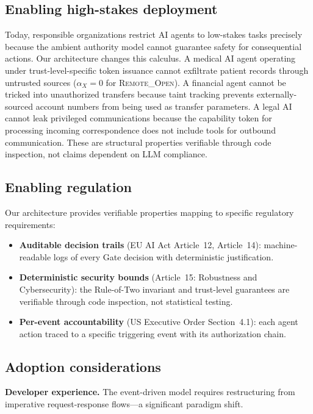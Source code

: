 \documentclass[pdflatex,sn-nature]{sn-jnl}%
\theoremstyle{thmstyleone}%
\theoremstyle{thmstyletwo}%
\theoremstyle{thmstylethree}%
\begin{document}
\subsection{Enabling high-stakes deployment}\label{subsec:highstakes}

Today, responsible organizations restrict AI agents to low-stakes tasks precisely because the ambient authority model cannot guarantee safety for consequential actions. Our architecture changes this calculus. A medical AI agent operating under trust-level-specific token issuance cannot exfiltrate patient records through untrusted sources ($\alpha_X = 0$ for \textsc{Remote\_Open}). A financial agent cannot be tricked into unauthorized transfers because taint tracking prevents externally-sourced account numbers from being used as transfer parameters. A legal AI cannot leak privileged communications because the capability token for processing incoming correspondence does not include tools for outbound communication. These are structural properties verifiable through code inspection, not claims dependent on LLM compliance.

\subsection{Enabling regulation}\label{subsec:regulation}

Our architecture provides verifiable properties mapping to specific regulatory requirements:
\begin{itemize}
  \item \textbf{Auditable decision trails} (EU AI Act Article~12, Article~14): machine-readable logs of every Gate decision with deterministic justification.
  \item \textbf{Deterministic security bounds} (Article~15: Robustness and Cybersecurity): the Rule-of-Two invariant and trust-level guarantees are verifiable through code inspection, not statistical testing.
  \item \textbf{Per-event accountability} (US Executive Order Section~4.1): each agent action traced to a specific triggering event with its authorization chain.
\end{itemize}

\subsection{Adoption considerations}\label{subsec:adoption}

\textbf{Developer experience.} The event-driven model requires restructuring from imperative request-response flows---a significant paradigm shift.
\end{document}
